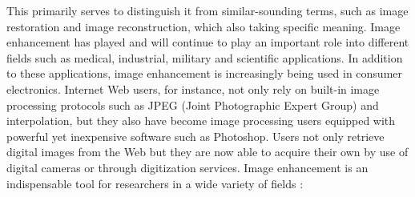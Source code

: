 This primarily serves to distinguish it from similar-sounding terms, such as image restoration and image reconstruction, which also taking specific meaning\cite{lime2}. Image enhancement has played and will continue to play an important role into different fields such as medical, industrial, military and scientific applications. In addition to these applications, image enhancement is increasingly being used in consumer electronics\cite{ie1}. Internet Web users, for instance, not only rely on built-in image processing protocols such as JPEG (Joint Photographic Expert Group) and interpolation, but they also have become image processing users equipped with powerful yet inexpensive software such as Photoshop. Users not only retrieve digital images from the Web but they are now able to acquire their own by use of digital cameras or through digitization services. Image enhancement is an indispensable tool for researchers in a wide variety of fields \cite{colorSpace2}:
